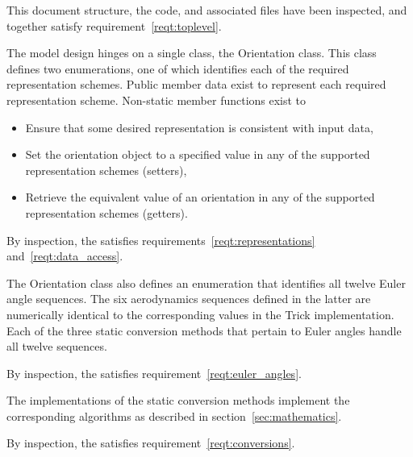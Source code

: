 \label{inspect:TLI}
This document structure, the code, and associated files have been inspected, and together satisfy requirement~\ref{reqt:toplevel}.

\label{inspect:representations}
The model design hinges on a single class, the Orientation class.
This class defines two enumerations, one of which identifies each of the required
representation schemes. Public member data exist to represent each required
representation scheme.
Non-static member functions exist to
\begin{itemize}
\item Ensure that some desired representation is consistent with input data,
\item Set the orientation object to a specified value in any of the supported
representation schemes (setters),
\item Retrieve the equivalent value of an orientation in any of the supported
representation schemes (getters).
\end{itemize}

By inspection, the \ModelDesc satisfies
requirements~\ref{reqt:representations} and~\ref{reqt:data_access}.


\label{inspect:euler}
The Orientation class also defines an enumeration that identifies all twelve
Euler angle sequences. The six aerodynamics sequences defined in the latter are
numerically identical to the corresponding values in the Trick implementation.
Each of the three static conversion methods that pertain to Euler angles handle
all twelve sequences.

By inspection, the \ModelDesc satisfies
requirement~\ref{reqt:euler_angles}.


\label{inspect:math}
The implementations of the static conversion methods
implement the corresponding algorithms as described in
section~\ref{sec:mathematics}.

By inspection, the \ModelDesc satisfies
requirement~\ref{reqt:conversions}.